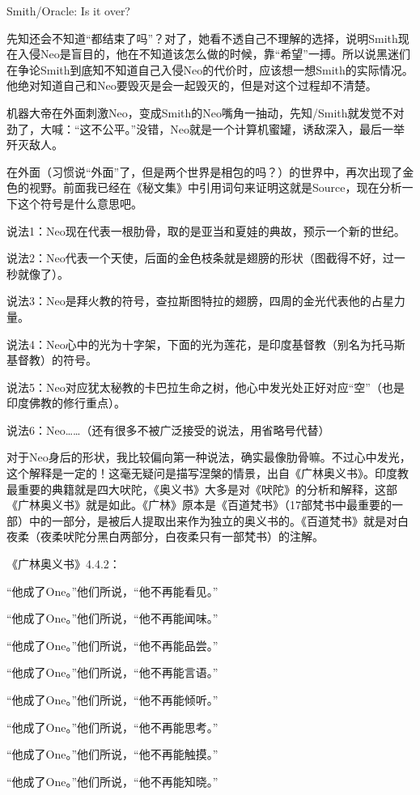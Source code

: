 \documentclass[UTF8]{ctexart}
\newenvironment{myquote}{\color{green} \setlength{\leftskip}{6em} \setlength{\rightskip}{4em} \setlength{\parindent}{-2em}}{\par}
\begin{document}
\begin{myquote}
Smith/Oracle: Is it over?
\end{myquote}

先知还会不知道“都结束了吗”？对了，她看不透自己不理解的选择，说明Smith现在入侵Neo是盲目的，他在不知道该怎么做的时候，靠“希望”一搏。所以说黑迷们在争论Smith到底知不知道自己入侵Neo的代价时，应该想一想Smith的实际情况。他绝对知道自己和Neo要毁灭是会一起毁灭的，但是对这个过程却不清楚。

机器大帝在外面刺激Neo，变成Smith的Neo嘴角一抽动，先知/Smith就发觉不对劲了，大喊：“这不公平。”没错，Neo就是一个计算机蜜罐，诱敌深入，最后一举歼灭敌人。

在外面（习惯说“外面”了，但是两个世界是相包的吗？）的世界中，再次出现了金色的视野。前面我已经在《秘文集》中引用词句来证明这就是Source，现在分析一下这个符号是什么意思吧。

说法1：Neo现在代表一根肋骨，取的是亚当和夏娃的典故，预示一个新的世纪。

说法2：Neo代表一个天使，后面的金色枝条就是翅膀的形状（图截得不好，过一秒就像了）。

说法3：Neo是拜火教的符号，查拉斯图特拉的翅膀，四周的金光代表他的占星力量。

说法4：Neo心中的光为十字架，下面的光为莲花，是印度基督教（别名为托马斯基督教）的符号。

说法5：Neo对应犹太秘教的卡巴拉生命之树，他心中发光处正好对应“空”（也是印度佛教的修行重点）。

说法6：Neo……（还有很多不被广泛接受的说法，用省略号代替）

对于Neo身后的形状，我比较偏向第一种说法，确实最像肋骨嘛。不过心中发光，这个解释是一定的！这毫无疑问是描写涅槃的情景，出自《广林奥义书》。印度教最重要的典籍就是四大吠陀，《奥义书》大多是对《吠陀》的分析和解释，这部《广林奥义书》就是如此。《广林》原本是《百道梵书》（17部梵书中最重要的一部）中的一部分，是被后人提取出来作为独立的奥义书的。《百道梵书》就是对白夜柔（夜柔吠陀分黑白两部分，白夜柔只有一部梵书）的注解。

《广林奥义书》4.4.2：

{\centering \it

“他成了One。”他们所说，“他不再能看见。”

“他成了One。”他们所说，“他不再能闻味。”

“他成了One。”他们所说，“他不再能品尝。”

“他成了One。”他们所说，“他不再能言语。”

“他成了One。”他们所说，“他不再能倾听。”

“他成了One。”他们所说，“他不再能思考。”

“他成了One。”他们所说，“他不再能触摸。”

“他成了One。”他们所说，“他不再能知晓。”

}
\end{document}
